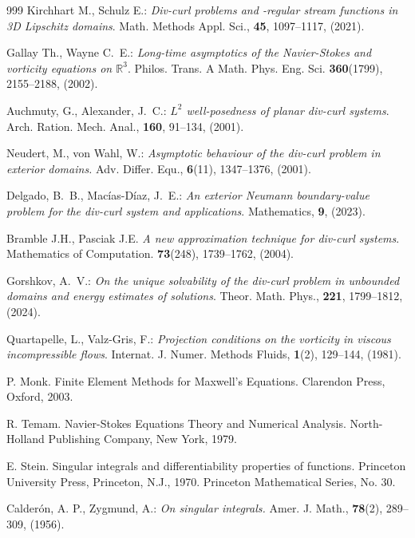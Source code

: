 \documentclass[a4paper]{article}
\newcommand{\R}{\mathbb{R}}
\begin{document}
\begin{thebibliography}{999}
Kirchhart M., Schulz E.: {\em Div-curl problems and -regular stream functions in 3D Lipschitz domains}. Math. Methods Appl. Sci., {\bf 45}, 1097--1117, (2021).

 Gallay Th., Wayne C.~E.: {\em Long-time asymptotics of the Navier-Stokes and vorticity equations on $\R^3$}. Philos. Trans. A Math. Phys. Eng. Sci.  {\bf 360}(1799), 2155--2188, (2002).

Auchmuty, G., Alexander, J.~C.:{ \em{$L^2$ well-posedness of planar div-curl systems}}. {Arch. Ration. Mech. Anal.}, {\bf 160}, 91--134, (2001). 

Neudert, M., von Wahl, W.: {\em{Asymptotic behaviour of the div-curl problem in exterior domains.}}
{Adv. Differ. Equ.}, {\bf 6}(11), 1347--1376, (2001).

 Delgado, B.~B., Mac\'ias-D\'iaz, J.~E.:  {\em{An exterior Neumann boundary-value problem for the div-curl system and applications}}. {Mathematics}, {\bf 9}, (2023). 

 Bramble J.H., Pasciak J.E. {\em A new approximation technique for div-curl systems}. Mathematics of Computation. {\bf 73}(248), 1739--1762, (2004).

Gorshkov, A.~V.: {\em {On the unique solvability of the div-curl problem in unbounded domains and energy estimates of solutions}}.  { Theor. Math. Phys.}, {\bf 221}, 1799--1812, (2024).  

 Quartapelle, L., Valz-Gris, F.:  {\em{Projection conditions on the vorticity in viscous incompressible flows}}. { Internat. J. Numer. Methods Fluids}, {\bf 1}(2), 129--144, (1981).

 P. Monk. {Finite Element Methods for Maxwell's Equations.} Clarendon Press, Oxford, 2003. 

 R. Temam. {Navier-Stokes Equations Theory and Numerical Analysis.} North-Holland Publishing Company, New York, 1979.

 E. Stein. {Singular integrals and differentiability properties of functions.} Princeton
University Press, Princeton, N.J., 1970. Princeton Mathematical Series, No. 30.

 Calder\'on, A. P., Zygmund, A.: {\em{On singular integrals.}} { Amer. J. Math.}, {\bf 78}(2), 289--309, (1956). 
\end{thebibliography}
\end{document}
